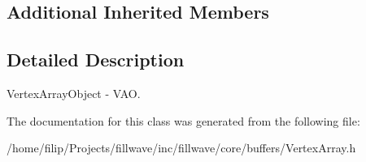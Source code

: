 \subsection*{Additional Inherited Members}


\subsection{Detailed Description}
Vertex\+Array\+Object -\/ V\+A\+O. 

The documentation for this class was generated from the following file\+:\begin{DoxyCompactItemize}
\item 
/home/filip/\+Projects/fillwave/inc/fillwave/core/buffers/Vertex\+Array.\+h\end{DoxyCompactItemize}
